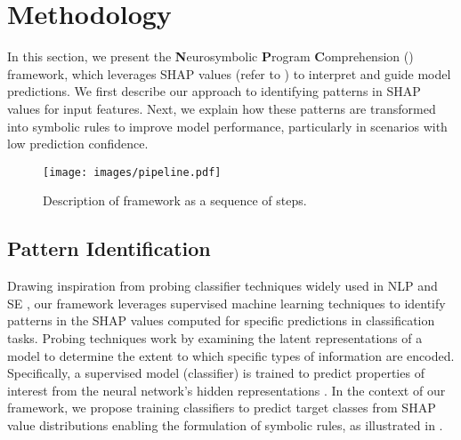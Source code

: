 \section{Methodology}
\label{sec:approach}

In this section, we present the \textbf{N}eurosymbolic \textbf{P}rogram \textbf{C}omprehension (\framework) framework, which leverages SHAP values (refer to ) to interpret and guide model predictions. We first describe our approach to identifying patterns in SHAP values for input features. Next, we explain how these patterns are transformed into symbolic rules to improve model performance, particularly in scenarios with low prediction confidence.

\begin{figure}[ht]
		\centering
  \vspace{-1.5em}
  \texttt{[image: images/pipeline.pdf]}
		\caption{Description of \framework framework as a sequence of steps.}
    \label{fig:npc_pipeline}
    \vspace{-1em}
\end{figure}



\subsection{Pattern Identification}
\label{sec:npc_pattern_identification}

Drawing inspiration from probing classifier techniques widely used in NLP \cite{hewitt_designing_2019} and SE \cite{lopez_ast-probe_2022, troshin_probing_2022}, our framework leverages supervised machine learning techniques to identify patterns in the SHAP values computed for specific predictions in classification tasks. Probing techniques work by examining the latent representations of a model to determine the extent to which specific types of information are encoded. Specifically, a supervised model (\eg classifier) is trained to predict properties of interest from the neural network's hidden representations \cite{belinkov_probing_2021}. In the context of our framework, we propose training classifiers to predict target classes from SHAP value distributions enabling the formulation of symbolic rules, as illustrated in .


